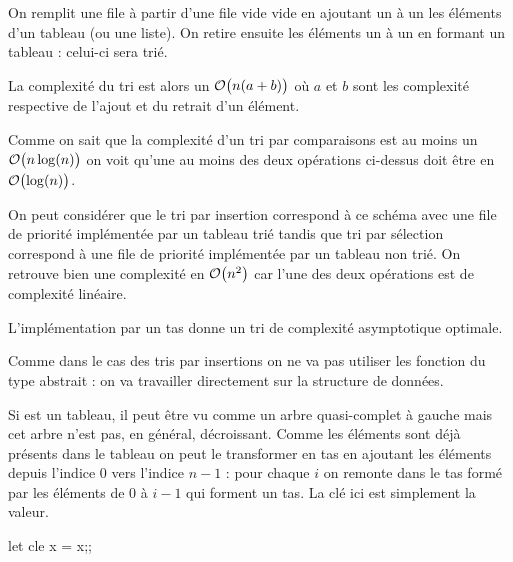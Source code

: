 On remplit une file à partir d'une file vide vide en ajoutant un à un les éléments d'un tableau (ou une liste). On retire ensuite les éléments un à un en formant un tableau : celui-ci sera trié.

La complexité du tri est alors un ${\cal O}\bigl(n(a+b)\bigr)$ où $a$ et $b$ sont les complexité respective de l'ajout et du retrait d'un élément.

Comme on sait que la complexité d'un tri par comparaisons est au moins un ${\cal O}\bigl(n\log(n)\bigr)$ on voit qu'une au moins des deux opérations ci-dessus doit être en ${\cal O}\bigl(\log(n)\bigr)$.

On peut considérer que le tri par insertion correspond à ce schéma avec une file de priorité implémentée par un tableau trié tandis que tri par sélection correspond à une file de priorité implémentée par un tableau non trié. On retrouve bien une complexité en ${\cal O}\bigl(n^2\bigr)$ car l'une des deux opérations est de complexité linéaire.

L'implémentation par un tas donne un tri de complexité asymptotique optimale.

\medskip

Comme dans le cas des tris par insertions on ne va pas utiliser les fonction du type abstrait : on va travailler directement sur la structure de données.

\medskip

Si  est un tableau, il peut être vu comme un arbre quasi-complet à gauche mais cet arbre n'est pas, en général, décroissant. Comme les éléments sont déjà présents dans le tableau on peut le transformer en tas en ajoutant les éléments depuis l'indice 0 vers l'indice $n-1$ : pour chaque $i$ on remonte   dans le tas formé par les éléments de 0 à $i-1$ qui forment un tas. La clé ici est simplement la valeur.
\begin{ocaml}
let cle x = x;;
\end{ocaml}

